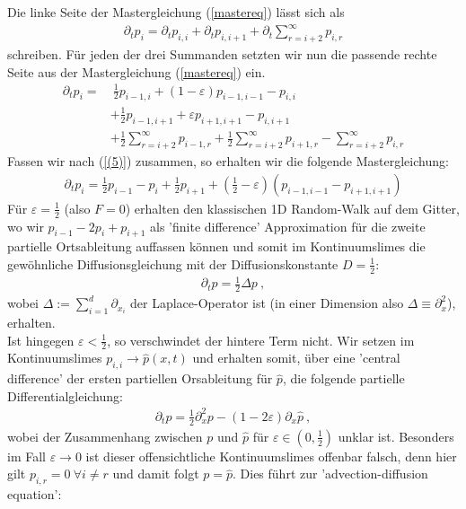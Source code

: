 \documentclass[a4paper, 12pt]{report}
\begin{document}
Die linke Seite der Mastergleichung (\ref{mastereq}) lässt sich als
\begin{align}
\partial_t p_i=\partial_t p_{i,i} +\partial_t p_{i,i+1} +\partial_t \sum_{r=i+2}^{\infty} p_{i,r}
\end{align}
schreiben. Für jeden der drei Summanden setzten wir nun die passende rechte Seite aus der Mastergleichung (\ref{mastereq}) ein.
\begin{align}
\nonumber \partial_t p_i =&\ \frac{1}{2}p_{i-1,i} +(1-\varepsilon)p_{i-1,i-1}-p_{i,i}
\\
\nonumber &+\frac{1}{2}p_{i-1,i+1} +\varepsilon p_{i+1,i+1}-p_{i,i+1}
\\
\nonumber &+\frac{1}{2} \sum_{r=i+2}^{\infty}p_{i-1,r} + \frac{1}{2} \sum_{r=i+2}^{\infty}p_{i+1,r} - \sum_{r=i+2}^{\infty} p_{i,r}
\end{align}
Fassen wir nach (\ref{(5)}) zusammen, so erhalten wir die folgende Mastergleichung:
\begin{align}\label{(6)}
\partial_t p_i = \frac{1}{2}p_{i-1}-p_{i}+\frac{1}{2}p_{i+1} + (\frac{1}{2}-\varepsilon)(p_{i-1,i-1} - p_{i+1,i+1})
\end{align}
Für $\varepsilon = \frac{1}{2}$ (also $F=0$) erhalten den klassischen 1D Random-Walk auf dem Gitter, wo wir $p_{i-1}-2p_{i}+p_{i+1}$ als 'finite difference' Approximation für die zweite partielle Ortsableitung auffassen können und somit im Kontinuumslimes die gewöhnliche Diffusionsgleichung mit der Diffusionskonstante $D=\frac{1}{2}$:
\begin{align}
\partial_t p = \frac{1}{2}\Delta p\ ,
\end{align}
wobei $\Delta:=\sum_{i=1}^{d}\partial_{x_i}$ der Laplace-Operator ist (in einer Dimension also \break $\Delta \equiv \partial_x^2$), erhalten.
\\
Ist hingegen $\varepsilon < \frac{1}{2}$, so verschwindet der hintere Term nicht. Wir setzen im Kontinuumslimes $p_{i,i} \rightarrow \hat{p}(x,t)$ und erhalten somit, über eine 'central difference' der ersten partiellen Orsableitung für $\hat{p}$, die folgende partielle Differentialgleichung:
\begin{align}
\partial_t p = \frac{1}{2} \partial_x^2 p -(1-2\varepsilon)\partial_x \hat{p}\ ,
\end{align}
wobei der Zusammenhang zwischen $p$ und $\hat{p}$ für $\varepsilon \in (0,\frac{1}{2})$ unklar ist.
Besonders im Fall $\varepsilon \rightarrow 0$ ist dieser offensichtliche Kontinuumslimes offenbar falsch, denn hier gilt $p_{i,r}=0\ \forall i \neq r$ und damit folgt $p=\hat{p}$. Dies führt zur 'advection-diffusion equation':
\end{document}
